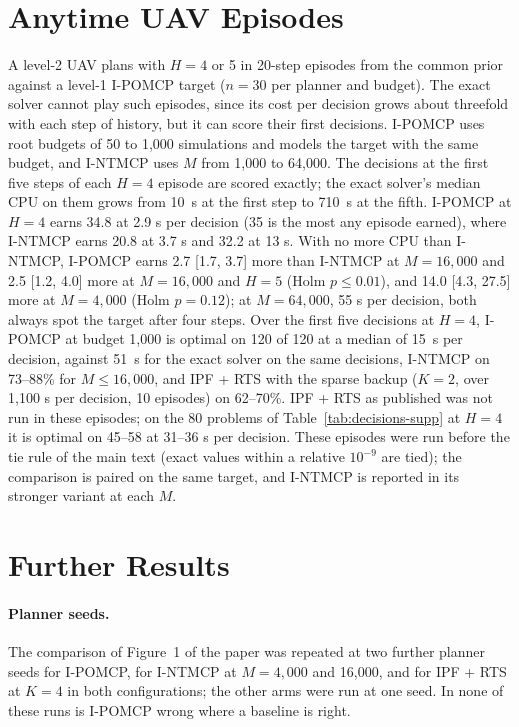 \documentclass{article}
\begin{document}
\section{Anytime UAV Episodes}

A level-2 UAV plans with $H = 4$ or 5 in 20-step episodes from the common prior against a level-1 I-POMCP target ($n = 30$ per planner and budget). The exact solver cannot play such episodes, since its cost per decision grows about threefold with each step of history, but it can score their first decisions. I-POMCP uses root budgets of 50 to 1{,}000 simulations and models the target with the same budget, and I-NTMCP uses $M$ from 1{,}000 to 64{,}000. The decisions at the first five steps of each $H = 4$ episode are scored exactly; the exact solver's median CPU on them grows from 10~s at the first step to 710~s at the fifth. I-POMCP at $H = 4$ earns 34.8 at 2.9 s per decision (35 is the most any episode earned), where I-NTMCP earns 20.8 at 3.7 s and 32.2 at 13 s. With no more CPU than I-NTMCP, I-POMCP earns 2.7 [1.7, 3.7] more than I-NTMCP at $M = 16{,}000$ and 2.5 [1.2, 4.0] more at $M = 16{,}000$ and $H = 5$ (Holm $p \leq 0.01$), and 14.0 [4.3, 27.5] more at $M = 4{,}000$ (Holm $p = 0.12$); at $M = 64{,}000$, 55 s per decision, both always spot the target after four steps. Over the first five decisions at $H = 4$, I-POMCP at budget 1{,}000 is optimal on 120 of 120 at a median of 15~s per decision, against 51~s for the exact solver on the same decisions, I-NTMCP on 73--88\% for $M \leq 16{,}000$, and IPF + RTS with the sparse backup ($K = 2$, over 1{,}100 s per decision, 10 episodes) on 62--70\%. IPF + RTS as published was not run in these episodes; on the 80 problems of Table~\ref{tab:decisions-supp} at $H = 4$ it is optimal on 45--58 at 31--36 s per decision. These episodes were run before the tie rule of the main text (exact values within a relative $10^{-9}$ are tied); the comparison is paired on the same target, and I-NTMCP is reported in its stronger variant at each $M$.

\section{Further Results}
\label{sec:further}

\paragraph{Planner seeds.} The comparison of Figure~1 of the paper was repeated at two further planner seeds for I-POMCP, for I-NTMCP at $M = 4{,}000$ and 16{,}000, and for IPF + RTS at $K = 4$ in both configurations; the other arms were run at one seed. In none of these runs is I-POMCP wrong where a baseline is right.
\end{document}
